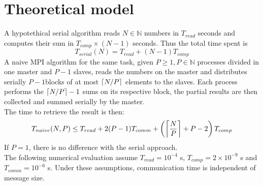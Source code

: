 \documentclass[a4paper, 11pt]{article}
\DeclarePairedDelimiter{\ceil}{\lceil}{\rceil}
\begin{document}
\section{Theoretical model}
A hypotethical serial algorithm reads $N \in \mathbb{N}$ numbers in $T_{read}$ seconds and computes their sum in $T_{comp} \times (N-1)$ seconds. Thus the total time spent is
$$T_{serial}(N) = T_{read} + (N-1)T_{comp}$$
A naive MPI algorithm for the same task, given $P \geq 1, P \in \mathbb{N}$ processes divided in one master and $P-1$ slaves, reads the numbers on the master and distributes serially $P-1$blocks of at most $\ceil{N/P}$ elements to the slaves. Each process performs the $\ceil{N/P}-1$ sums on its respective block, the partial results are then collected and summed serially by the master.\\
The time to retrieve the result is then:
$$T_{naive}(N, P) \leq T_{read} + 2(P-1)T_{comm} + \left(\ceil[\bigg]{\frac{N}{P}}+P-2\right)T_{comp}$$
If $P=1$, there is no difference with the serial approach.\\
The following numerical evaluation assume $T_{read} = 10^{-4}$ s, $T_{comp} = 2 \times 10^{-9}$ s and $T_{comm} = 10^{-6}$ s.
Under these assumptions, communication time is independent of message size.\\
\end{document}
